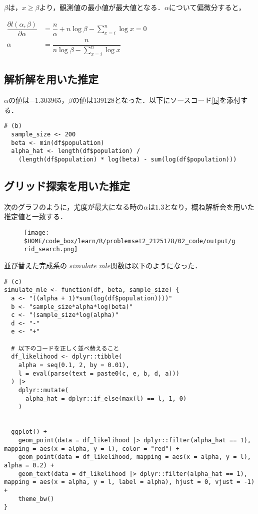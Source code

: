 \documentclass{article}
\begin{document}
$\beta$は，$x \geq \beta$より，観測値の最小値が最大値となる．$\alpha$について偏微分すると，
\begin{center}

  \begin{math}
    \begin{aligned}
      \dfrac{\partial l(\alpha, \beta)}{\partial \alpha} &=  \dfrac{n}{\alpha} + n\log\beta - \sum_{x = i}^{n} \log x = 0\\
      \alpha &= \dfrac{n}{n\log\beta - \sum_{x = i}^{n} \log x}
    \end{aligned}
  \end{math}
\end{center}

\subsection{解析解を用いた推定}

$\alpha$の値は$-1.303965$，$\beta$の値は$139128$となった．以下にソースコード\ref{b}を添付する．

\begin{lstlisting}[caption=解析解を用いた推定,label=b]
  # (b)
  sample_size <- 200 
  beta <- min(df$population) 
  alpha_hat <- length(df$population) /
    (length(df$population) * log(beta) - sum(log(df$population)))
\end{lstlisting}

\subsection{グリッド探索を用いた推定}

次のグラフのように，尤度が最大になる時の$\alpha$は$1.3$となり，概ね解析会を用いた推定値と一致する．

\begin{figure}[H]
  \centering
  \texttt{[image: \\\$HOME/code\_box/learn/R/problemset2\_2125178/02\_code/output/grid\_search.png]}
\end{figure}

並び替えた完成系の $simulate\_mle$関数は以下のようになった．


\begin{lstlisting}[caption=解析解を用いた推定,label=c]
# (c)
simulate_mle <- function(df, beta, sample_size) {
  a <- "((alpha + 1)*sum(log(df$population))))"
  b <- "sample_size*alpha*log(beta)"
  c <- "(sample_size*log(alpha)"
  d <- "-"
  e <- "+"

  # 以下のコードを正しく並べ替えること
  df_likelihood <- dplyr::tibble(
    alpha = seq(0.1, 2, by = 0.01),
    l = eval(parse(text = paste0(c, e, b, d, a)))
  ) |>
    dplyr::mutate(
      alpha_hat = dplyr::if_else(max(l) == l, 1, 0)
    )


  ggplot() +
    geom_point(data = df_likelihood |> dplyr::filter(alpha_hat == 1), mapping = aes(x = alpha, y = l), color = "red") +
    geom_point(data = df_likelihood, mapping = aes(x = alpha, y = l), alpha = 0.2) +
    geom_text(data = df_likelihood |> dplyr::filter(alpha_hat == 1), mapping = aes(x = alpha, y = l, label = alpha), hjust = 0, vjust = -1) +
    theme_bw()
}
\end{lstlisting}
\end{document}
